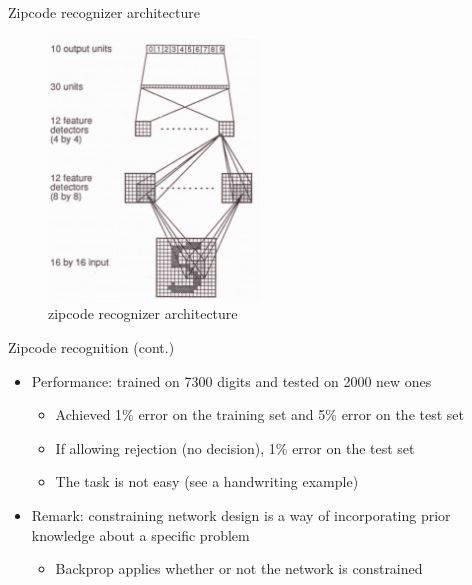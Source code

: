 \documentclass[notes]{beamer}
\providecommand{\tightlist}{%
  \setlength{\itemsep}{0pt}\setlength{\parskip}{0pt}}
\begin{document}
\begin{frame}{Zipcode recognizer architecture}

\begin{figure}
\centering
\includegraphics[width=0.50000\textwidth]{2018-03-10-16-07-59.png}
\caption{zipcode recognizer architecture}
\end{figure}

\end{frame}

\begin{frame}{Zipcode recognition (cont.)}

\begin{itemize}
\tightlist
\item
  Performance: trained on 7300 digits and tested on 2000 new ones

  \begin{itemize}
  \tightlist
  \item
    Achieved 1\% error on the training set and 5\% error on the test set
  \item
    If allowing rejection (no decision), 1\% error on the test set
  \item
    The task is not easy (see a handwriting example)
  \end{itemize}
\item
  Remark: constraining network design is a way of incorporating prior
  knowledge about a specific problem

  \begin{itemize}
  \tightlist
  \item
    Backprop applies whether or not the network is constrained
  \end{itemize}
\end{itemize}

\end{frame}
\end{document}
